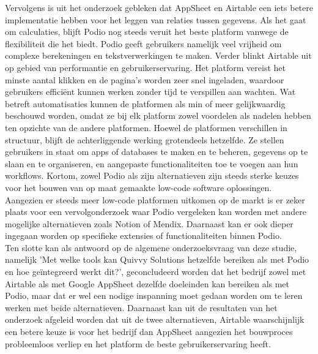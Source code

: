 Vervolgens is uit het onderzoek gebleken dat AppSheet en Airtable een iets betere implementatie hebben voor het leggen van relaties tussen gegevens. Als het gaat om calculaties, blijft Podio nog steeds veruit het beste platform vanwege de flexibiliteit die het biedt. Podio geeft gebruikers namelijk veel vrijheid om complexe berekeningen en tekstverwerkingen te maken. Verder blinkt Airtable uit op gebied van performantie en gebruikerservaring. Het platform vereist het minste aantal klikken en de pagina's worden zeer snel ingeladen, waardoor gebruikers efficiënt kunnen werken zonder tijd te verspillen aan wachten. Wat betreft automatisaties kunnen de platformen als min of meer gelijkwaardig beschouwd worden, omdat ze bij elk platform zowel voordelen als nadelen hebben ten opzichte van de andere platformen. Hoewel de platformen verschillen in structuur, blijft de achterliggende werking grotendeels hetzelfde. Ze stellen gebruikers in staat om apps of databases te maken en te beheren, gegevens op te slaan en te organiseren, en aangepaste functionaliteiten toe te voegen aan hun workflows. Kortom, zowel Podio als zijn alternatieven zijn steeds sterke keuzes voor het bouwen van op maat gemaakte low-code software oplossingen. \\

Aangezien er steeds meer low-code platformen uitkomen op de markt is er zeker plaats voor een vervolgonderzoek waar Podio vergeleken kan worden met andere mogelijke alternatieven zoals Notion of Mendix. Daarnaast kan er ook dieper ingegaan worden op specifieke extensies of functionaliteiten binnen Podio. \\ 

Ten slotte kan als antwoord op de algemene onderzoeksvraag van deze studie, namelijk 'Met welke tools kan Quivvy Solutions hetzelfde bereiken als met Podio en hoe geïntegreerd werkt dit?', geconcludeerd worden dat het bedrijf zowel met Airtable als met Google AppSheet dezelfde doeleinden kan bereiken als met Podio, maar dat er wel een nodige inspanning moet gedaan worden om te leren werken met beide alternatieven. Daarnaast kan uit de resultaten van het onderzoek afgeleid worden dat uit de twee alternatieven, Airtable waarschijnlijk een betere keuze is voor het bedrijf dan AppSheet aangezien het bouwproces probleemloos verliep en het platform de beste gebruikerservaring heeft. \\ 